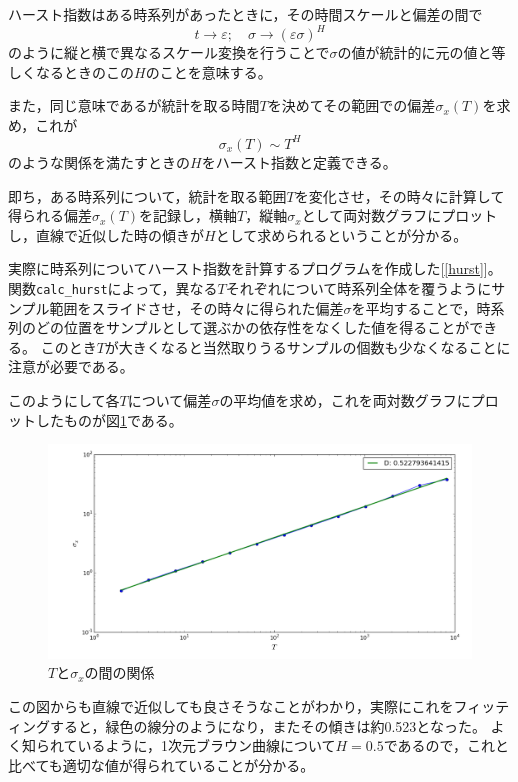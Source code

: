 \documentclass{jsarticle}
\theoremstyle{definition}
\begin{document}
ハースト指数はある時系列があったときに，その時間スケールと偏差の間で
\[t \rightarrow \varepsilon;\quad \sigma \rightarrow (\varepsilon \sigma)^{H}\]
のように縦と横で異なるスケール変換を行うことで$\sigma$の値が統計的に元の値と等しくなるときのこの$H$のことを意味する。

また，同じ意味であるが統計を取る時間$T$を決めてその範囲での偏差$\sigma_{x}(T)$を求め，これが
\[\sigma_{x}(T) \sim T^{H}\]
のような関係を満たすときの$H$をハースト指数と定義できる。

即ち，ある時系列について，統計を取る範囲$T$を変化させ，その時々に計算して得られる偏差$\sigma_{x}(T)$を記録し，横軸$T$，縦軸$\sigma_{x}$として両対数グラフにプロットし，直線で近似した時の傾きが$H$として求められるということが分かる。

実際に時系列についてハースト指数を計算するプログラムを作成した[\ref{hurst}]。
関数\texttt{calc\_hurst}によって，異なる$T$それぞれについて時系列全体を覆うようにサンプル範囲をスライドさせ，その時々に得られた偏差$\sigma$を平均することで，時系列のどの位置をサンプルとして選ぶかの依存性をなくした値を得ることができる。
このとき$T$が大きくなると当然取りうるサンプルの個数も少なくなることに注意が必要である。

このようにして各$T$について偏差$\sigma$の平均値を求め，これを両対数グラフにプロットしたものが図\ref{fig:f4}である。

\begin{figure}[H]
  \begin{center}
    \includegraphics[width=\textwidth]{../img/hurst_exponent.pdf}
    \caption{$T$と$\sigma_{x}$の間の関係}
    \label{fig:f4}
  \end{center}
\end{figure}

この図からも直線で近似しても良さそうなことがわかり，実際にこれをフィッティングすると，緑色の線分のようになり，またその傾きは約0.523となった。
よく知られているように，1次元ブラウン曲線について$H = 0.5$であるので，これと比べても適切な値が得られていることが分かる。
\end{document}

